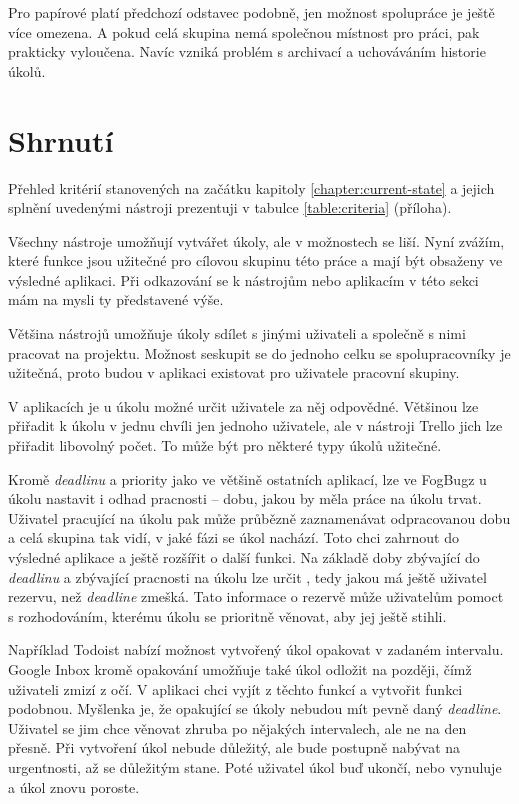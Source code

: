 \documentclass[thesis=B,czech]{FITthesis}[2012/06/26]
\begin{document}
			Pro papírové  platí předchozí odstavec podobně, jen možnost spolupráce je ještě více omezena. A pokud celá skupina nemá společnou místnost pro práci, pak prakticky vyloučena. Navíc vzniká problém s archivací a uchováváním historie úkolů.
		
	
	\section{Shrnutí}
		Přehled kritérií stanovených na začátku kapitoly \ref{chapter:current-state} a jejich splnění uvedenými nástroji prezentuji v tabulce \ref{table:criteria} (příloha).
		
		Všechny nástroje umožňují vytvářet úkoly, ale v možnostech se liší. Nyní zvážím, které funkce jsou užitečné pro cílovou skupinu této práce a mají být obsaženy ve výsledné aplikaci. Při odkazování se k nástrojům nebo aplikacím v této sekci mám na mysli ty představené výše.
		
		Většina nástrojů umožňuje úkoly sdílet s jinými uživateli a společně s nimi pracovat na projektu. Možnost seskupit se do jednoho celku se spolupracovníky je užitečná, proto budou v aplikaci existovat pro uživatele pracovní skupiny.
		
		V aplikacích je u úkolu možné určit uživatele za něj odpovědné. Většinou lze přiřadit k úkolu v jednu chvíli jen jednoho uživatele, ale v nástroji Trello jich lze přiřadit libovolný počet. To může být pro některé typy úkolů užitečné. 
		
		Kromě \textit{deadlinu} a priority jako ve většině ostatních aplikací, lze ve FogBugz u úkolu nastavit i odhad pracnosti -- dobu, jakou by měla práce na úkolu trvat. Uživatel pracující na úkolu pak může průbězně zaznamenávat odpracovanou dobu a celá skupina tak vidí, v jaké fázi se úkol nachází. Toto chci zahrnout do výsledné aplikace a ještě rozšířit o další funkci. Na základě doby zbývající do \textit{deadlinu} a zbývající pracnosti na úkolu lze určit , tedy jakou má ještě uživatel rezervu, než \textit{deadline} zmešká. Tato informace o rezervě může uživatelům pomoct s rozhodováním, kterému úkolu se prioritně věnovat, aby jej ještě stihli.
		
		Například Todoist nabízí možnost vytvořený úkol opakovat v zadaném intervalu. Google Inbox kromě opakování umožňuje také úkol odložit na později, čímž uživateli zmizí z očí. V aplikaci chci vyjít z těchto funkcí a vytvořit funkci podobnou. Myšlenka je, že opakující se úkoly nebudou mít pevně daný \textit{deadline}. Uživatel se jim chce věnovat zhruba po nějakých intervalech, ale ne na den přesně. Při vytvoření úkol nebude důležitý, ale bude postupně nabývat na urgentnosti, až se důležitým stane. Poté uživatel úkol buď ukončí, nebo vynuluje a úkol znovu poroste.
		
\end{document}
